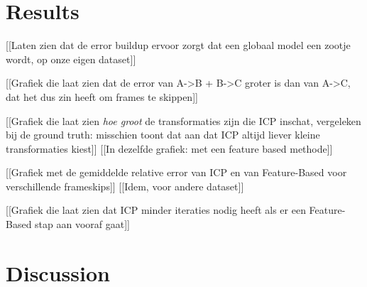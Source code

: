 \documentclass[a4paper]{article}
\begin{document}
\section{Results}

[[Laten zien dat de error buildup ervoor zorgt dat een globaal model een zootje wordt, op onze eigen dataset]]

[[Grafiek die laat zien dat de error van A->B + B->C groter is dan van A->C, dat het dus zin heeft om frames te skippen]]

[[Grafiek die laat zien \emph{hoe groot} de transformaties zijn die ICP inschat, vergeleken bij de ground truth: misschien toont dat aan dat ICP altijd liever kleine transformaties kiest]]
[[In dezelfde grafiek: met een feature based methode]]

[[Grafiek met de gemiddelde relative error van ICP en van Feature-Based voor verschillende frameskips]]
[[Idem, voor andere dataset]]

[[Grafiek die laat zien dat ICP minder iteraties nodig heeft als er een Feature-Based stap aan vooraf gaat]]

\section{Discussion}





{}

\end{document}
